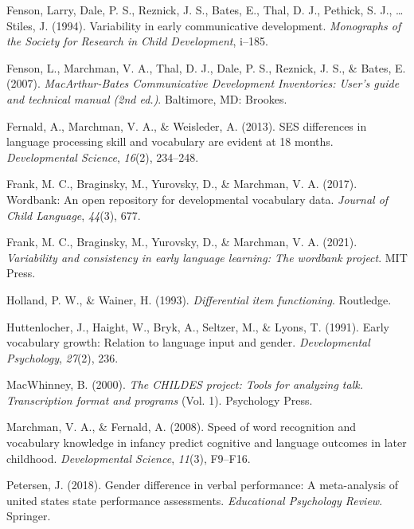 \documentclass[10pt, letterpaper]{article}
\newenvironment{CSLReferences}%
  {}%
  {\par}
\begin{document}
\begin{CSLReferences}{1}{0}
\leavevmode\hypertarget{ref-fenson1994}{}%
Fenson, Larry, Dale, P. S., Reznick, J. S., Bates, E., Thal, D. J.,
Pethick, S. J., \ldots{} Stiles, J. (1994). Variability in early
communicative development. \emph{Monographs of the Society for Research
in Child Development}, i--185.

\leavevmode\hypertarget{ref-Fenson2007}{}%
Fenson, L., Marchman, V. A., Thal, D. J., Dale, P. S., Reznick, J. S.,
\& Bates, E. (2007). \emph{{M}ac{A}rthur-{B}ates {C}ommunicative
{D}evelopment {I}nventories: User's guide and technical manual (2nd
ed.)}. Baltimore, MD: Brookes.

\leavevmode\hypertarget{ref-fernald2013ses}{}%
Fernald, A., Marchman, V. A., \& Weisleder, A. (2013). SES differences
in language processing skill and vocabulary are evident at 18 months.
\emph{Developmental Science}, \emph{16}(2), 234--248.

\leavevmode\hypertarget{ref-frank2017}{}%
Frank, M. C., Braginsky, M., Yurovsky, D., \& Marchman, V. A. (2017).
Wordbank: An open repository for developmental vocabulary data.
\emph{Journal of Child Language}, \emph{44}(3), 677.

\leavevmode\hypertarget{ref-frank2021}{}%
Frank, M. C., Braginsky, M., Yurovsky, D., \& Marchman, V. A. (2021).
\emph{Variability and consistency in early language learning: The
wordbank project}. MIT Press.

\leavevmode\hypertarget{ref-holland1993differential}{}%
Holland, P. W., \& Wainer, H. (1993). \emph{Differential item
functioning}. Routledge.

\leavevmode\hypertarget{ref-huttenlocher1991early}{}%
Huttenlocher, J., Haight, W., Bryk, A., Seltzer, M., \& Lyons, T.
(1991). Early vocabulary growth: Relation to language input and gender.
\emph{Developmental Psychology}, \emph{27}(2), 236.

\leavevmode\hypertarget{ref-macwhinney2000childes}{}%
MacWhinney, B. (2000). \emph{The CHILDES project: Tools for analyzing
talk. Transcription format and programs} (Vol. 1). Psychology Press.

\leavevmode\hypertarget{ref-marchman2008speed}{}%
Marchman, V. A., \& Fernald, A. (2008). Speed of word recognition and
vocabulary knowledge in infancy predict cognitive and language outcomes
in later childhood. \emph{Developmental Science}, \emph{11}(3), F9--F16.

\leavevmode\hypertarget{ref-petersen2018gender}{}%
Petersen, J. (2018). Gender difference in verbal performance: A
meta-analysis of united states state performance assessments.
\emph{Educational Psychology Review}. Springer.


\end{CSLReferences}
\end{document}
